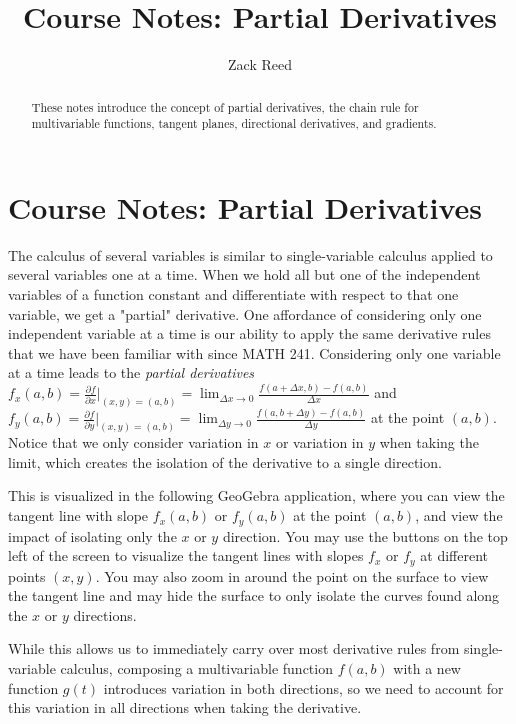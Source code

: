 \documentclass{ximera}
\title{Course Notes: Partial Derivatives}
\author{Zack Reed}
\begin{document}
\begin{abstract}
These notes introduce the concept of partial derivatives, the chain rule for multivariable functions, tangent planes, directional derivatives, and gradients.
\end{abstract}
\maketitle

\section{Course Notes: Partial Derivatives}

The calculus of several variables is similar to single-variable calculus applied to several variables one at a time. When we hold all but one of the independent variables of a function constant and differentiate with respect to that one variable, we get a "partial" derivative. One affordance of considering only one independent variable at a time is our ability to apply the same derivative rules that we have been familiar with since MATH 241. Considering only one variable at a time leads to the \emph{partial derivatives $f_x(a,b)=\frac{\partial f}{\partial x}\bigg|_{(x,y)=(a,b)}=\lim_{\Delta x\rightarrow 0}\frac{f(a+\Delta x,b)-f(a,b)}{\Delta x}$} and \emph{$f_y(a,b)=\frac{\partial f}{\partial y}\bigg|_{(x,y)=(a,b)}=\lim_{\Delta y\rightarrow 0}\frac{f(a,b+\Delta y)-f(a,b)}{\Delta y}$} at the point $(a,b)$. Notice that we only consider variation in $x$ or variation in $y$ when taking the limit, which creates the isolation of the derivative to a single direction.

This is visualized in the following GeoGebra application, where you can view the tangent line with slope $f_x(a,b)$ or $f_y(a,b)$ at the point $(a,b)$, and view the impact of isolating only the $x$ or $y$ direction. You may use the buttons on the top left of the screen to visualize the tangent lines with slopes $f_x$ or $f_y$ at different points $\left(x,y\right)$. You may also zoom in around the point on the surface to view the tangent line and may hide the surface to only isolate the curves found along the $x$ or $y$ directions.

\begin{center}
\end{center}

While this allows us to immediately carry over most derivative rules from single-variable calculus, composing a multivariable function $f(a,b)$ with a new function $g(t)$ introduces variation in both directions, so we need to account for this variation in all directions when taking the derivative.
\end{document}
